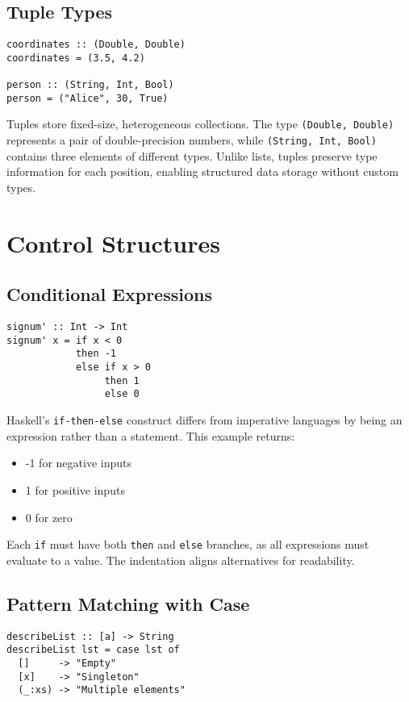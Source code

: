 \documentclass{book}
\begin{document}
\subsection{Tuple Types}
\begin{lstlisting}
coordinates :: (Double, Double)
coordinates = (3.5, 4.2)

person :: (String, Int, Bool)
person = ("Alice", 30, True)
\end{lstlisting}

Tuples store fixed-size, heterogeneous collections. The type \texttt{(Double, Double)} represents a pair of double-precision numbers, while \texttt{(String, Int, Bool)} contains three elements of different types. Unlike lists, tuples preserve type information for each position, enabling structured data storage without custom types.

\section{Control Structures}
\label{sec:control}

\subsection{Conditional Expressions}
\begin{lstlisting}
signum' :: Int -> Int
signum' x = if x < 0 
            then -1 
            else if x > 0 
                 then 1 
                 else 0
\end{lstlisting}

Haskell's \texttt{if-then-else} construct differs from imperative languages by being an expression rather than a statement. This example returns:
\begin{itemize}
\item -1 for negative inputs
\item 1 for positive inputs
\item 0 for zero
\end{itemize}

Each \texttt{if} must have both \texttt{then} and \texttt{else} branches, as all expressions must evaluate to a value. The indentation aligns alternatives for readability.

\subsection{Pattern Matching with Case}
\begin{lstlisting}
describeList :: [a] -> String
describeList lst = case lst of
  []     -> "Empty"
  [x]    -> "Singleton"
  (_:xs) -> "Multiple elements"
\end{lstlisting}
\end{document}
